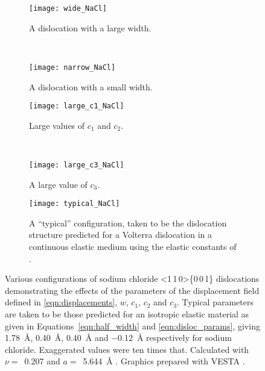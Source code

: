 \begin{figure}
\centering

    \begin{subfigure}{0.4\textwidth}
    \centering
    \texttt{[image: wide\_NaCl]}
    \caption{A dislocation with a large width.}
    \end{subfigure}
    ~
    \begin{subfigure}{0.4\textwidth}
    \centering
    \texttt{[image: narrow\_NaCl]}
    \caption{A dislocation with a small width.}
    \end{subfigure}

	\begin{subfigure}{0.4\textwidth}
	\centering
    \texttt{[image: large\_c1\_NaCl]}
    \caption{Large values of $c_1$ and $c_2$.}
	\end{subfigure}
    ~
	\begin{subfigure}{0.4\textwidth}
	\centering
    \texttt{[image: large\_c3\_NaCl]}
    \caption{A large value of $c_3$.}
	\end{subfigure}

    \begin{subfigure}{0.8\textwidth}
    \centering
    \texttt{[image: typical\_NaCl]}
    \captionsetup{width=0.8\textwidth}
    \caption{A ``typical'' configuration, taken to be the dislocation structure predicted for a Volterra dislocation in a continuous elastic medium using the elastic constants of .}
    \end{subfigure}

\captionsetup{width=0.9\textwidth}
\caption[The displacement field around an edge dislocation in rock salt.]{Various configurations of sodium chloride <1\,1\,0>\{0\,0\,1\} dislocations demonstrating the effects of the parameters of the displacement field defined in \autoref{eqn:displacements}, $w$, $c_1$, $c_2$ and $c_3$. Typical parameters are taken to be those predicted for an isotropic elastic material as given in  Equations~\ref{eqn:half_width} and \ref{eqn:disloc_params}, giving \SI{1.78}{\angstrom}, \SI{0.40}{\angstrom}, \SI{0.40}{\angstrom} and \SI{-0.12}{\angstrom} respectively for sodium chloride. Exaggerated values were ten times that. Calculated with $\nu =$~\num{0.207} and $a =$~\SI{5.644}{\angstrom} \cite{Theocaris1994,Rao1990}. Graphics prepared with VESTA \cite{Momma2011}.\label{fig:parameters_of_the_disloc_configuration}}
\end{figure}


